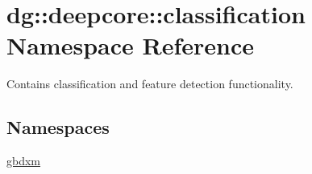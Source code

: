 \hypertarget{namespacedg_1_1deepcore_1_1classification}{}\section{dg\+:\+:deepcore\+:\+:classification Namespace Reference}
\label{namespacedg_1_1deepcore_1_1classification}


Contains classification and feature detection functionality.  


\subsection*{Namespaces}
\begin{DoxyCompactItemize}
\item 
 \hyperlink{namespacedg_1_1deepcore_1_1classification_1_1gbdxm}{gbdxm}
\end{DoxyCompactItemize}
